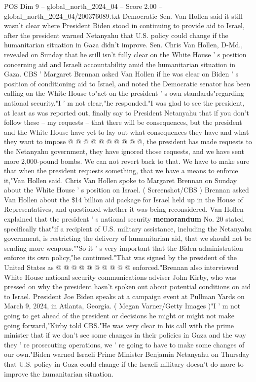 \begin{textsample}{POS Dim 9 – global\_north\_2024\_04 – Score 2.00 – global\_north\_2024\_04/200376089.txt}  \label{ex:f9_pos_179}
Democratic Sen.
Van Hollen said it still wasn't clear where President Biden stood in continuing to provide aid to Israel, after the president warned Netanyahu that U.S. policy could change if the humanitarian situation in Gaza didn't improve.
Sen.
Chris Van Hollen, D-Md., revealed on Sunday that he still isn't fully clear on the White House ' s position concerning aid and Israeli accountability amid the humanitarian situation in Gaza.
CBS ' Margaret Brennan asked Van Hollen if he was clear on Biden ' s position of conditioning aid to Israel, and noted the Democratic senator has been calling on the White House to"act on the president ' s own standards"regarding national security."I ' m not clear,"he responded."I was glad to see the president, at least as was reported out, finally say to President Netanyahu that if you don't follow these -- my requests -- that there will be consequences, but the president and the White House have yet to lay out what consequences they have and what they want to impose @ @ @ @ @ @ @ @ @ @, the president has made requests to the Netanyahu government, they have ignored those requests, and we have sent more 2,000-pound bombs.
We can not revert back to that.
We have to make sure that when the president requests something, that we have a means to enforce it,"Van Hollen said.
Chris Van Hollen spoke to Margaret Brennan on Sunday about the White House ' s position on Israel. ( Screenshot/CBS ) Brennan asked Van Hollen about the \$14 billion aid package for Israel held up in the House of Representatives, and questioned whether it was being reconsidered.
Van Hollen explained that the president ' s national security \textbf{memorandum} No. 20 stated specifically that"if a recipient of U.S. military assistance, including the Netanyahu government, is restricting the delivery of humanitarian aid, that we should not be sending more weapons.""So it ' s very important that the Biden administration enforce its own policy,"he continued."That was signed by the president of the United States as @ @ @ @ @ @ @ @ @ @ enforced."Brennan also interviewed White House national security communications adviser John Kirby, who was pressed on why the president hasn't spoken out about potential conditions on aid to Israel.
President Joe Biden speaks at a campaign event at Pullman Yards on March 9, 2024, in Atlanta, Georgia. ( Megan Varner/Getty Images )"I ' m not going to get ahead of the president or decisions he might or might not make going forward,"Kirby told CBS."He was very clear in his call with the prime minister that if we don't see some changes in their policies in Gaza and the way they ' re prosecuting operations, we ' re going to have to make some changes of our own."Biden warned Israeli Prime Minister Benjamin Netanyahu on Thursday that U.S. policy in Gaza could change if the Israeli military doesn't do more to improve the humanitarian situation.

\end{textsample}
